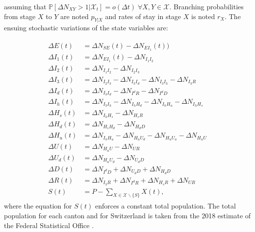 \noindent assuming that \(\mathbb{P}[\Delta N_{XY} > 1|\mathcal{X}_t] = o(\Delta t) \; \forall X,Y \in \mathcal{X}\). Branching probabilities from stage $X$ to $Y$ are noted $p_{Y|X}$ and rates of stay in stage $X$ is noted $r_X$.
The ensuing stochastic variations of the state variables are:

\begin{gather}
\label{eq:stochstates}
\begin{aligned}
    \Delta E(t) &= \Delta N_{SE}(t) - \Delta N_{EI_1}(t))\\
    \Delta I_1(t) &= \Delta N_{EI_1}(t) - \Delta N_{I_1 I_2}\\
    \Delta I_2(t) &= \Delta N_{I_1 I_2} - \Delta N_{I_2 I_3}\\
    \Delta I_3(t) &=  \Delta N_{I_2 I_3} - \Delta N_{I_3 I_d} - \Delta N_{I_3 I_h} -  \Delta N_{I_3 R}\\
    \Delta I_d(t) &= \Delta N_{I_3 I_d} - \Delta N_{I^d R} - \Delta N_{I^d D}\\
    \Delta I_h(t) &= \Delta N_{I_3 I_h} -  \Delta N_{I_h H_d} -  \Delta N_{I_h H_u} -  \Delta N_{I_h H_s} \\
    \Delta H_s(t) &= \Delta N_{I_h H_s} -  \Delta N_{H_s R}\\
   \Delta H_d(t) &= \Delta N_{H_s H_d} -  \Delta N_{H_d D}\\
    \Delta H_u(t) &= \Delta N_{I_h H_u} - \Delta N_{H_u U_d} - \Delta N_{H_u U_a} - \Delta N_{H_u U}\\
    \Delta U(t) &=  \Delta N_{H_u U} - \Delta N_{U R}\\
    \Delta U_d(t) &=  \Delta N_{H_u U_d} - \Delta N_{U_d D}\\
    \Delta D(t) &=  \Delta N_{I^d D} + \Delta N_{U_d D} + \Delta N_{H_d D}\\
    \Delta R(t) &= \Delta N_{I_3 R} + \Delta N_{I^d R} +  \Delta N_{H_s R} + \Delta N_{U R} \\
     S(t) &= P - \sum_{X \in \mathcal{X} \backslash \{S\}} X(t),
\end{aligned}
\end{gather}
where the equation for \(S(t)\) enforces a constant total population. The total population for each canton and for Switzerland is taken from the 2018 estimate of the Federal Statistical Office \cite{office_federal_de_la_statistique_population_2018}.



